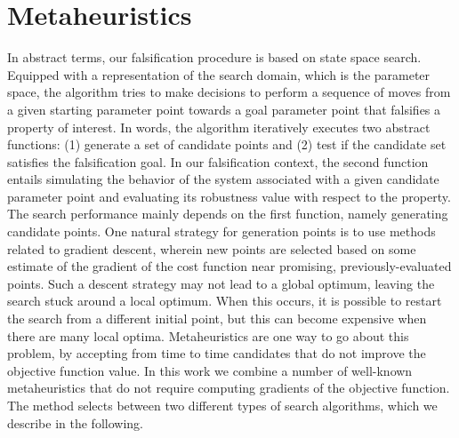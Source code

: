 \section{Metaheuristics}\label{Solvers}
In abstract terms, our falsification procedure is based on state space search. Equipped with a representation of the search domain, which is the parameter space, the algorithm tries to make decisions to perform a sequence of moves from a given starting parameter point towards a goal parameter point that falsifies a property of interest. In words, the algorithm iteratively executes two abstract functions: (1) generate a set of candidate points and (2) test if the candidate set satisfies the falsification goal. In our falsification context, the second function entails simulating the behavior of the system associated with a given candidate parameter point and evaluating its robustness value with respect to the property. The search performance mainly depends on the first function, namely generating candidate points. 
One natural strategy for generation points is to use methods related to gradient descent, wherein new points are selected based on some estimate of the gradient of the cost function near promising, previously-evaluated points.
Such a descent strategy may not lead to a global optimum, leaving the search stuck around a local optimum. 
When this occurs, it is possible to restart the search from a different initial point, but this can become expensive when there are many local optima. Metaheuristics \cite{dreo:hal-01341683} are one way to go about this problem, by accepting from time to time candidates that do not improve the objective function value. In this work we combine a number of well-known metaheuristics that do not require computing gradients of the objective function. The method 
selects between two different types of search algorithms, which we describe in the following. %


